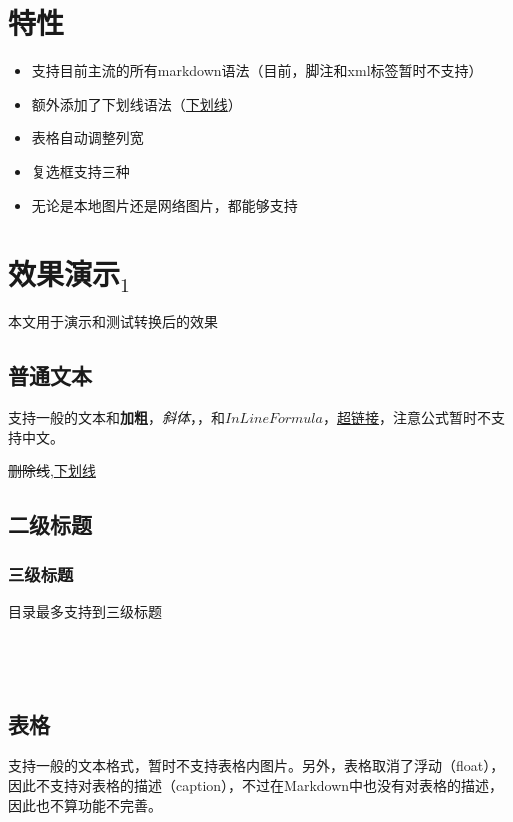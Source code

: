 \documentclass[UTF8]{ctexart}
\newenvironment{marktext}{}{}
\begin{document}
\normalsize
\tableofcontents
\newpage
\begin{marktext}
\section{特性}


\end{marktext}
\begin{itemize}
\item
支持目前主流的所有markdown语法（目前，脚注和xml标签暂时不支持）
\item
额外添加了下划线语法（\underline{下划线}）
\item
表格自动调整列宽
\item
复选框支持三种
\item
无论是本地图片还是网络图片，都能够支持
\end{itemize}
\begin{marktext}


\section{效果演示$_1$}




本文用于演示和测试转换后的效果


\subsection{普通文本}


支持一般的文本和\textbf{加粗}，\textit{斜体}，，和$InLine Formula$，\href{http://github.com}{超链接}，注意公式暂时不支持中文。


\sout{删除线},\underline{下划线}


\subsection{二级标题}




\subsubsection{三级标题}


目录最多支持到三级标题
\\\\
\\\\






\subsection{表格}


支持一般的文本格式，暂时不支持表格内图片。另外，表格取消了浮动（float），因此不支持对表格的描述（caption），不过在Markdown中也没有对表格的描述，因此也不算功能不完善。


\end{marktext}
\end{document}
